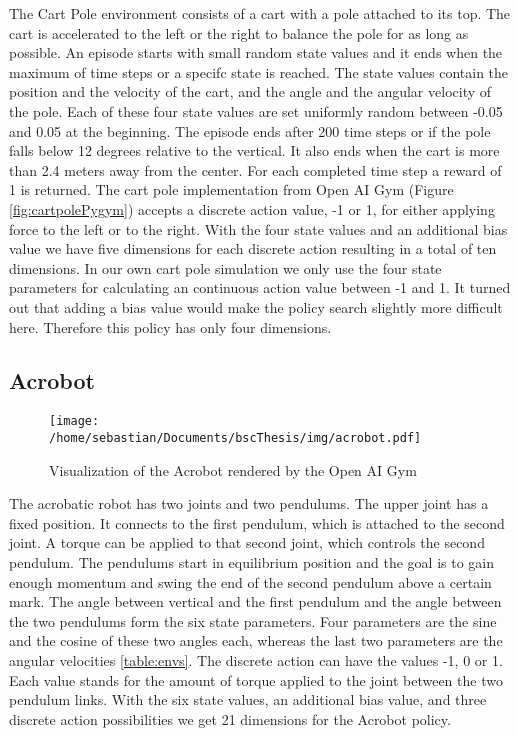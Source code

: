 The Cart Pole environment consists of a cart with a pole attached to its top. The cart is accelerated to the left or the right to balance the pole for as long as possible. An episode starts with small random state values and it ends when the maximum of time steps or a specifc state is reached. The state values contain the position and the velocity of the cart, and the angle and the angular velocity of the pole. Each of these four state values are set uniformly random between -0.05 and 0.05 at the beginning. The episode ends after 200 time steps or if the pole falls below 12 degrees relative to the vertical. It also ends when the cart is more than 2.4 meters away from the center. For each completed time step a reward of 1 is returned. The cart pole implementation from Open AI Gym (Figure \ref{fig:cartpolePygym}) accepts a discrete action value, -1 or 1, for either applying force to the left or to the right. With the four state values and an additional bias value we have five dimensions for each discrete action resulting in a total of ten dimensions. In our own cart pole simulation we only use the four state parameters for calculating an continuous action value between -1 and 1. It turned out that adding a bias value would make the policy search slightly more difficult here. Therefore this policy has only four dimensions.

\subsection{Acrobot}


\begin{wrapfigure}{R}{0.5\textwidth}
    \centering
    \texttt{[image: /home/sebastian/Documents/bscThesis/img/acrobot.pdf]}
    \caption{Visualization of the Acrobot rendered by the Open AI Gym\label{fig:acrobotPygym}}
\end{wrapfigure}

The acrobatic robot has two joints and two pendulums. The upper joint has a fixed position. It connects to the first pendulum, which is attached to the second joint. A torque can be applied to that second joint, which controls the second pendulum. The pendulums start in equilibrium position and the goal is to gain enough momentum and swing the end of the second pendulum above a certain mark. The angle between vertical and the first pendulum and the angle between the two pendulums form the six state parameters. Four parameters are the sine and the cosine of these two angles each, whereas the last two parameters are the angular velocities \ref{table:envs}. The discrete action can have the values -1, 0 or 1. Each value stands for the amount of torque applied to the joint between the two pendulum links. With the six state values, an additional bias value, and three discrete action possibilities we get 21 dimensions for the Acrobot policy.

